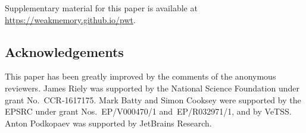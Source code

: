 




Supplementary material for this paper is available at
\url{https://weakmemory.github.io/pwt}.

\subsection*{Acknowledgements}
This paper has been greatly improved by the comments of the anonymous reviewers.
%
James Riely was supported by the National Science Foundation under
grant No.~CCR-1617175.
%
Mark Batty and Simon Cooksey were supported by the EPSRC under grant
Nos.~EP/V000470/1 and~EP/R032971/1, and by VeTSS.
%
Anton Podkopaev was supported by JetBrains Research.


